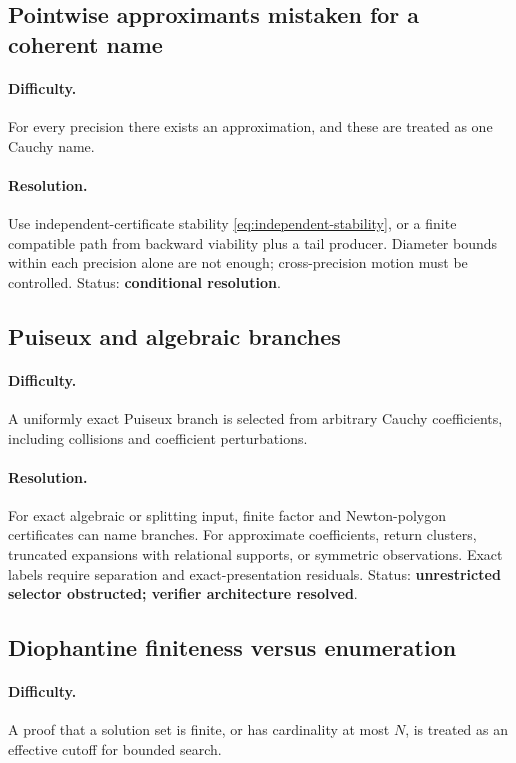 \subsection{Pointwise approximants mistaken for a coherent name}

\paragraph{Difficulty.}
For every precision there exists an approximation, and these are treated as one Cauchy name.

\paragraph{Resolution.}
Use independent-certificate stability \eqref{eq:independent-stability}, or a finite compatible path from backward viability plus a tail producer.  Diameter bounds within each precision alone are not enough; cross-precision motion must be controlled.  Status: \textbf{conditional resolution}.

\subsection{Puiseux and algebraic branches}

\paragraph{Difficulty.}
A uniformly exact Puiseux branch is selected from arbitrary Cauchy coefficients, including collisions and coefficient perturbations.

\paragraph{Resolution.}
For exact algebraic or splitting input, finite factor and Newton-polygon certificates can name branches.  For approximate coefficients, return clusters, truncated expansions with relational supports, or symmetric observations.  Exact labels require separation and exact-presentation residuals.  Status: \textbf{unrestricted selector obstructed; verifier architecture resolved}.

\subsection{Diophantine finiteness versus enumeration}

\paragraph{Difficulty.}
A proof that a solution set is finite, or has cardinality at most \(N\), is treated as an effective cutoff for bounded search.

